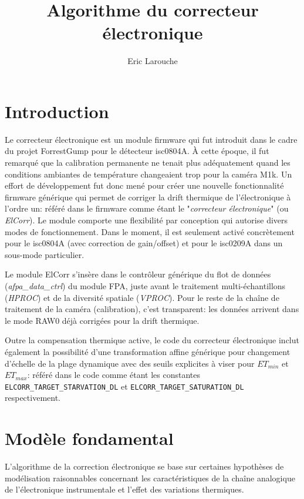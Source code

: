 \documentclass[11pt]{report}
\title{Algorithme du correcteur électronique}
\author{Eric Larouche}
\begin{document}
\maketitle
\tableofcontents

\section{Introduction}

Le correcteur électronique est un module firmware qui fut introduit dans le cadre du projet ForrestGump pour le détecteur isc0804A. À cette époque, il fut remarqué que la calibration permanente ne tenait plus adéquatement quand les conditions ambiantes de température changeaient trop pour la caméra M1k. Un effort de développement fut donc mené pour créer une nouvelle fonctionnalité firmware générique qui permet de corriger la drift thermique de l'électronique à l'ordre un: référé dans le firmware comme étant le "\emph{correcteur électronique}" (ou \emph{ElCorr}). Le module comporte une flexibilité par conception qui autorise divers modes de fonctionnement.   Dans le moment, il est seulement activé concrètement pour le isc0804A (avec correction de gain/offset) et pour le isc0209A dans un sous-mode particulier.

Le module ElCorr s'insère dans le contrôleur générique du flot de données (\emph{afpa\_data\_ctrl}) du module FPA, juste avant le traitement multi-échantillons (\emph{HPROC}) et de la diversité spatiale (\emph{VPROC}). Pour le reste de la chaîne de traitement de la caméra (calibration), c'est transparent: les données arrivent dans le mode RAW0 déjà corrigées pour la drift thermique.

Outre la compensation thermique active, le code du correcteur électronique inclut également la possibilité d'une transformation affine générique pour changement d'échelle de la plage dynamique avec des seuils explicites à viser pour $ET_{min}$ et $ET_{max}$: référé dans le code comme étant les constantes \texttt{ELCORR\_TARGET\_STARVATION\_DL} et \texttt{ELCORR\_TARGET\_SATURATION\_DL} respectivement.

\section{Modèle fondamental}
L'algorithme de la correction électronique se base sur certaines hypothèses de modélisation raisonnables concernant les caractéristiques de la chaîne analogique de l'électronique instrumentale et l'effet des variations thermiques.
\end{document}
